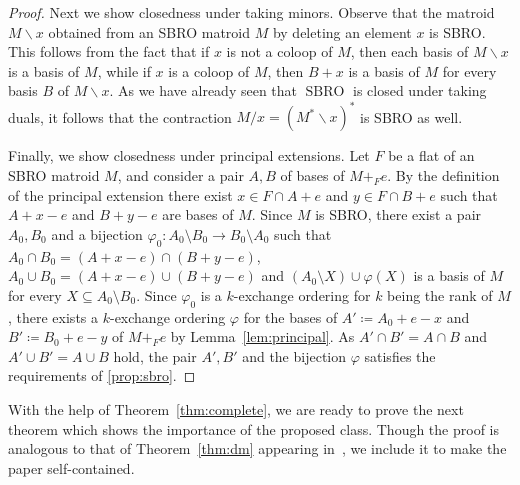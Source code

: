 \documentclass[11pt,a4paper]{article}
\theoremstyle{plain}
\theoremstyle{definition}
\DeclareMathOperator*{\sbro}{SBRO}
\begin{document}
\begin{proof}
Next we show closedness under taking minors. Observe that the matroid $M \backslash x$ obtained from an SBRO matroid $M$ by deleting an element $x$ is SBRO. This follows from the fact that if $x$ is not a coloop of $M$, then each basis of $M \backslash x$ is a basis of $M$, while if $x$ is a coloop of $M$, then $B+x$ is a basis of $M$ for every basis $B$ of $M\backslash x$. As we have already seen that $\sbro$ is closed under taking duals, it follows that the contraction $M/x = (M^*\backslash x)^*$ is SBRO as well.     

Finally, we show closedness under principal extensions. Let $F$ be a flat of an SBRO matroid $M$, and consider a pair $A, B$ of bases of $M+_{F} e$. By the definition of the principal extension there exist $x \in F \cap A+e$ and $y \in F\cap B + e$ such that $A+x-e$ and $B+y-e$ are bases of $M$. Since $M$ is SBRO, there exist a pair $A_0, B_0$ and a bijection $\varphi_0\colon A_0 \setminus B_0 \to B_0 \setminus A_0$ such that $A_0 \cap B_0 = (A+x-e) \cap (B+y-e)$, $A_0 \cup B_0 = (A+x-e) \cup (B+y-e)$ and $(A_0 \setminus X) \cup \varphi(X)$ is a basis of $M$ for every $X \subseteq A_0 \setminus B_0$. Since $\varphi_0$ is a $k$-exchange ordering for $k$ being the rank of $M$, there exists a $k$-exchange ordering $\varphi$ for the bases of $A' \coloneqq A_0+e-x$ and $B' \coloneqq B_0+e-y$ of $M+_F e$ by Lemma~\ref{lem:principal}. As $A' \cap B' = A \cap B$ and $A' \cup B' = A \cup B$ hold, the pair $A', B'$ and the bijection $\varphi$ satisfies the requirements of \ref{prop:sbro}. 
\end{proof}

With the help of Theorem~\ref{thm:complete}, we are ready to prove the next theorem which shows the importance of the proposed class. Though the proof is analogous to that of Theorem~\ref{thm:dm} appearing in~\cite[Theorem~42.13]{schrijver2003combinatorial}, we include it to make the paper self-contained. 
\end{document}
